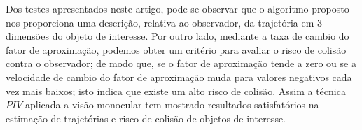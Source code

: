 
\begin{comment}
From the presented examples,
it can be observed that one application that uses the tracking
and the departure factor is related with the risk of collision.
It is possible to estimate how of fast an object is departing.
Thus, if the  departure factor tends to zero or 
if the velocity of departure factor changes to lower negatives values every time, 
probably, there is a high risk of collision. The $PIV$ technique has presented satisfactory results. 
It can be concluded that estimating collision using velocity of departure factor, 
tracking of objects in 2 or 3 dimensions, and departure distance
relative to the first position of $ROI$. 
The simulations in both cases has given promissory results.
\end{comment}

Dos testes apresentados neste artigo, pode-se observar que o algoritmo proposto
nos proporciona uma descrição, relativa ao observador, 
da trajetória em $3$ dimensões do objeto de interesse.
Por outro lado, mediante a taxa de cambio do fator de aproximação, podemos obter 
um critério para avaliar o risco de colisão contra o observador;
de modo que, se o fator de aproximação tende a zero ou se a velocidade de cambio 
do fator de aproximação muda 
para valores negativos cada vez mais baixos; isto indica que
existe um alto risco de colisão.
Assim a técnica $PIV$ aplicada a visão monocular tem mostrado resultados satisfatórios 
na estimação de trajetórias e risco de colisão de objetos de interesse.

